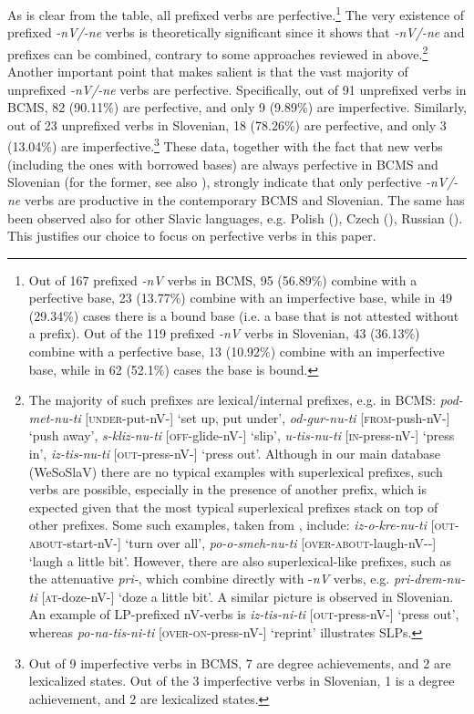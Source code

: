 \documentclass[output=paper,colorlinks,citecolor=brown]{langscibook}
\begin{document}
As is clear from the table, all prefixed verbs are perfective.\footnote{Out of 167 prefixed \textit{-nV} verbs in BCMS, 95 (56.89\%) combine with a perfective base, 23 (13.77\%) combine with an imperfective base, while in 49 (29.34\%) cases there is a bound base (i.e. a base that is not attested without a prefix). Out of the 119 prefixed \textit{-nV} verbs in Slovenian, 43 (36.13\%) combine with a perfective base, 13 (10.92\%) combine with an imperfective base, while in 62 (52.1\%) cases the base is bound.} The very existence of prefixed \textit{-nV/-ne} verbs is theoretically significant since it shows that \textit{-nV/-ne} and prefixes can be combined, contrary to some approaches reviewed in  above.\footnote{The majority of such prefixes are lexical/internal prefixes, e.g. in BCMS: \textit{pod-met-nu-ti} [\textsc{under}-put-nV-{\INF}] `set up, put under', \textit{od-gur-nu-ti} [\textsc{from}-push-nV-{\INF}] `push away', \textit{s-kliz-nu-ti} [\textsc{off}-glide-nV-{\INF}] `slip', \textit{u-tis-nu-ti} [\textsc{in}-press-nV-{\INF}] `press in', \textit{iz-tis-nu-ti} [\textsc{out}-press-nV-{\INF}] `press out'. Although in our main database (WeSoSlaV) there are no typical examples with superlexical prefixes, such verbs are possible, especially in the presence of another prefix, which is expected given that the most typical superlexical prefixes stack on top of other prefixes. Some such examples, taken from \citet{Stojanović2016}, include: \textit{iz-o-kre-nu-ti} [\textsc{out}-\textsc{about}-start-nV-{\INF}] `turn over all', \textit{po-o-smeh-nu-ti} [\textsc{over}-\textsc{about}-laugh-nV-{\INF}-{\REFL}] `laugh a little bit'. However, there are also superlexical-like prefixes, such as the attenuative \textit{pri-}, which combine directly with -\textit{nV} verbs, e.g. \textit{pri-drem-nu-ti} [\textsc{at}-doze-nV-{\INF}] `doze a little bit'. A similar picture is observed in Slovenian. An example of LP-prefixed nV-verbs is \textit{iz-tis-ni-ti} [\textsc{out}-press-nV-{\INF}] `press out', whereas \textit{po-na-tis-ni-ti} [\textsc{over}-\textsc{on}-press-nV-{\INF}] `reprint' illustrates SLPs.} Another important point that  makes salient is that the vast majority of unprefixed \textit{-nV/-ne} verbs are perfective. Specifically, out of 91 unprefixed verbs in BCMS, 82 (90.11\%) are perfective, and only 9 (9.89\%) are imperfective. Similarly, out of 23 unprefixed verbs in Slovenian, 18 (78.26\%) are perfective, and only 3 (13.04\%) are imperfective.\footnote{Out of 9 imperfective verbs in BCMS, 7 are degree achievements, and 2 are lexicalized states. Out of the 3 imperfective verbs in Slovenian, 1 is a degree achievement, and 2 are lexicalized states.} These data, together with the fact that new verbs (including the ones with borrowed bases) are always perfective in BCMS and Slovenian (for the former, see also \citealt{Simonovic2015}), strongly indicate that only perfective \textit{-nV/-ne} verbs are productive in the contemporary BCMS and Slovenian. The same has been observed also for other Slavic languages, e.g. Polish (\citealt{KlimekEtAl2018}), Czech (\citealt{TaraldsenMedovaWiland2019, Wiland2019}), Russian (\citealt{Sokolova2015}). This justifies our choice to focus on perfective verbs in this paper.
\end{document}
